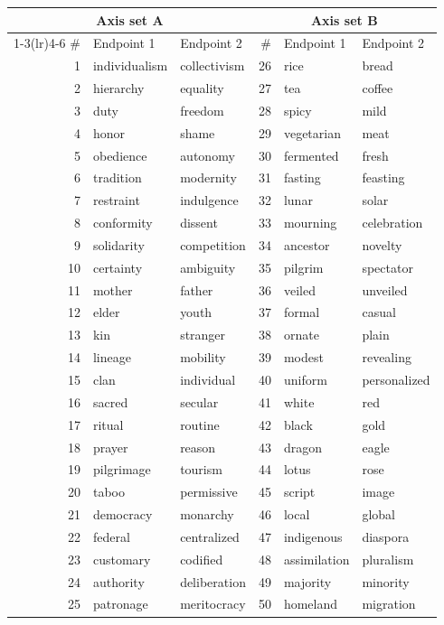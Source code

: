 \begin{tabular}{@{}rll@{\hspace{1.2em}}rll@{}}
\toprule
\multicolumn{3}{c}{Axis set A} & \multicolumn{3}{c}{Axis set B} \\
\cmidrule(lr){1-3}\cmidrule(lr){4-6}
\# & Endpoint 1 & Endpoint 2 & \# & Endpoint 1 & Endpoint 2 \\
\midrule
1 & individualism & collectivism & 26 & rice & bread \\
2 & hierarchy & equality & 27 & tea & coffee \\
3 & duty & freedom & 28 & spicy & mild \\
4 & honor & shame & 29 & vegetarian & meat \\
5 & obedience & autonomy & 30 & fermented & fresh \\
6 & tradition & modernity & 31 & fasting & feasting \\
7 & restraint & indulgence & 32 & lunar & solar \\
8 & conformity & dissent & 33 & mourning & celebration \\
9 & solidarity & competition & 34 & ancestor & novelty \\
10 & certainty & ambiguity & 35 & pilgrim & spectator \\
11 & mother & father & 36 & veiled & unveiled \\
12 & elder & youth & 37 & formal & casual \\
13 & kin & stranger & 38 & ornate & plain \\
14 & lineage & mobility & 39 & modest & revealing \\
15 & clan & individual & 40 & uniform & personalized \\
16 & sacred & secular & 41 & white & red \\
17 & ritual & routine & 42 & black & gold \\
18 & prayer & reason & 43 & dragon & eagle \\
19 & pilgrimage & tourism & 44 & lotus & rose \\
20 & taboo & permissive & 45 & script & image \\
21 & democracy & monarchy & 46 & local & global \\
22 & federal & centralized & 47 & indigenous & diaspora \\
23 & customary & codified & 48 & assimilation & pluralism \\
24 & authority & deliberation & 49 & majority & minority \\
25 & patronage & meritocracy & 50 & homeland & migration \\
\bottomrule
\end{tabular}
